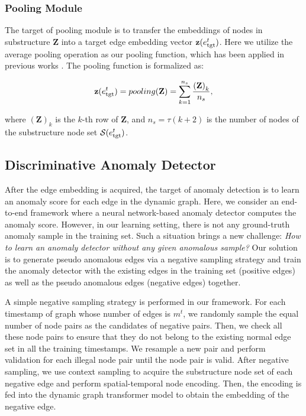 \documentclass[10pt,journal,compsoc]{IEEEtran}
\newcommand{\HL}{}
\begin{document}
\subsubsection{\HL{Pooling} Module}

The target of pooling module is to transfer the embeddings of nodes in substructure $\mathbf{Z}$ into a target edge embedding vector $\mathbf{z}(e_{\rm tgt}^t)$. Here we utilize \HL{the} average pooling \HL{operation} as \HL{our pooling} function, which has been applied in previous works \cite{liu2021anomaly}. The \HL{pooling} function is formalized as:

\begin{equation}
\label{eq:pooling}
\mathbf{z}(e_{\rm tgt}^t) = pooling(\mathbf{Z})  = \sum_{k=1}^{n_s} \frac{\left(\mathbf{Z}\right)_{k}}{n_s},
\end{equation}

\noindent where $\left(\mathbf{Z}\right)_{k}$ is the $k$-th row of $\mathbf{Z}$, and $n_s=\tau(k+2)$ is the number of nodes of the substructure node set $\mathcal{S}(e_{\rm tgt}^t)$. 

\subsection{Discriminative Anomaly Detector} \label{subsec:detector}

After the edge embedding is acquired, the target of anomaly detection is to learn an anomaly score for each edge in the dynamic graph. Here, we consider an end-to-end framework where a neural network-based anomaly detector computes the anomaly score. However, in our learning setting, there is not any ground-truth anomaly sample in the training set. Such \HL{a} situation brings a new challenge: \textit{How to learn an anomaly detector without any given anomalous sample?} Our solution is to generate pseudo anomalous edges via a negative sampling strategy and train the anomaly detector with the existing edges in the training set (positive edges) as well as the pseudo anomalous edges (negative edges) together.

A simple negative sampling strategy is performed in our framework. For each timestamp of graph whose number of edges is $m^t$, we randomly sample the equal number of node pairs as the candidates of negative pairs. Then, we check all these node pairs to ensure that they do not belong to the existing normal edge set in all the training timestamps. We resample a new pair and perform validation for each illegal node pair until the node pair is valid. After negative sampling, we use context sampling to acquire the substructure node set of each negative edge and perform spatial-temporal node encoding. Then, the encoding is fed into the dynamic graph transformer model to obtain the embedding of the negative edge. 
\end{document}
